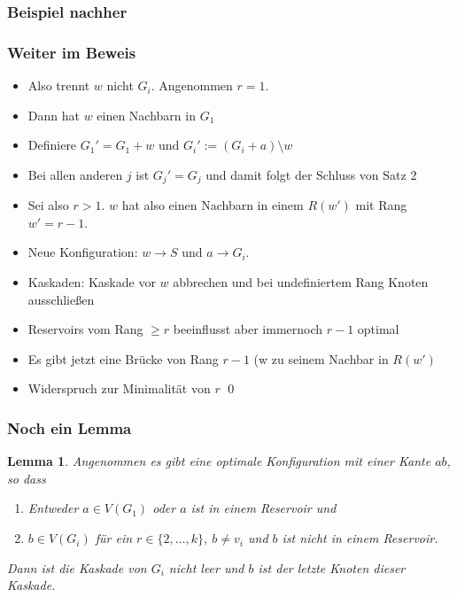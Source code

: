 \documentclass{beamer}
\theoremstyle{definition}
\theoremstyle{plain}
\newtheorem{lem}[auf]{Lemma}
\begin{document}
\begin{frame}
    \frametitle{Beispiel nachher}
     \begin{figure}
    \end{figure}
\end{frame}
\begin{frame}
    \frametitle{Weiter im Beweis}
     \begin{itemize}[<+->]
         \item Also trennt $w$ nicht $G_i$. Angenommen $r=1$.
         \item Dann hat $w$ einen Nachbarn in $G_1$
         \item Definiere $G_1'=G_1+w$ und $G_i':=(G_i+a)\setminus w$
         \item Bei allen anderen $j$ ist $G_j'=G_j$ und damit folgt der Schluss von Satz 2
         \item Sei also $r>1$. $w$ hat also einen Nachbarn in einem $R(w')$ mit Rang $w'=r-1$.
         \item Neue Konfiguration: $w\rightarrow S$ und $a\rightarrow G_i$. 
         \item Kaskaden: Kaskade vor $w$ abbrechen und bei undefiniertem Rang Knoten ausschließen
         \item Reservoirs vom Rang $\ge r$ beeinflusst aber immernoch $r-1$ optimal
         \item Es gibt jetzt eine Brücke von Rang $r-1$ (w zu seinem Nachbar in $R(w')$
         \item Widerspruch zur Minimalität von $r$ \qed
     \end{itemize}
\end{frame}
\begin{frame}
\frametitle{Noch ein Lemma}
\begin{lem}
Angenommen es gibt eine optimale Konfiguration mit einer Kante $ab$, so dass 
\begin{enumerate}
\item Entweder $a\in V(G_1)$ oder $a$ ist in einem Reservoir und
\item $b\in V(G_i)$ für ein $r\in\lbrace 2,\dotsc,k\rbrace,~b\neq v_i$ und $b$ ist nicht in einem Reservoir.
\end{enumerate}
Dann ist die Kaskade von $G_i$ nicht leer und $b$ ist der letzte Knoten dieser Kaskade.
\end{lem}
\end{frame}
\end{document}
